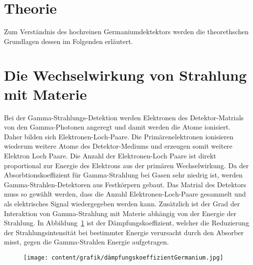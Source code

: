 \section{Theorie}
\label{sec:theorie}

Zum Verständnis des hochreinen Germaniumdektektors werden die theorethschen Grundlagen dessen im Folgenden erläutert.

\section{Die Wechselwirkung von Strahlung mit Materie}
\label{sec:WW mit Materie}

Bei der Gamma-Strahlungs-Detektion werden Elektronen des Detektor-Matrials von den Gamma-Photonen angeregt und damit werden die 
Atome ionisiert. Daher bilden sich Elektronen-Loch-Paare. Die Primärenelektronen ionisieren wiederum weitere Atome des Detektor-Mediums und erzeugen somit weitere Elektron Loch Paare.
Die Anzahl der Elektronen-Loch Paare ist direkt proportional zur Energie des Elektrons aus der primären
Wechselwirkung. Da der Absorbtionskoeffizient für Gamma-Strahlung bei Gasen sehr niedrig ist, 
werden Gamma-Strahlen-Detektoren aus Festkörpern gebaut. Das Matrial des Detektors muss so gewählt werden, dass
die Anzahl Elektronen-Loch-Paare gesammelt und als elektrisches Signal wiedergegeben werden kann.
Zusätzlich ist der Grad der Interaktion von Gamma-Strahlung mit Materie abhängig von der Energie der Strahlung.
In Abbildung~\ref{fig:koeffizient} ist der Dämpfungskoeffizient, welcher die Reduzierung der Strahlungsintensität
bei bestimmter Energie verursacht durch den Absorber misst, gegen die Gamma-Strahlen Energie aufgetragen.

\begin{figure}[H]
    \centering
    \texttt{[image: content/grafik/dämpfungskoeffizientGermanium.jpg]}
    \caption{ \cite{gamma_ray}}
    \label{fig:koeffizient}
\end{figure}